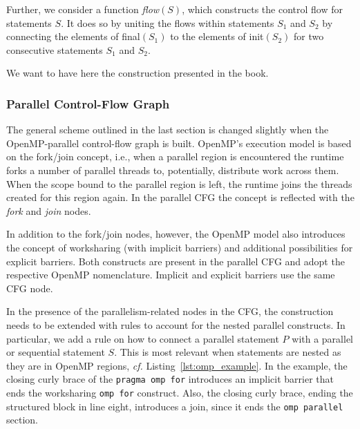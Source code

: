 \documentclass[natbib]{article}
\begin{document}
Further, we consider a function \emph{flow}$(S)$, which constructs the control flow for statements $S$.
It does so by uniting the flows within statements $S_1$ and $S_2$ by connecting the elements of final$(S_1)$ to the elements of init$(S_2)$ for two consecutive statements $S_1$ and $S_2$.

We want to have here the construction presented in the book.

\subsubsection{Parallel Control-Flow Graph}
The general scheme outlined in the last section is changed slightly when the OpenMP-parallel control-flow graph is built.
OpenMP's execution model is based on the fork/join concept, i.e., when a parallel region is encountered the runtime forks a number of parallel threads to, potentially, distribute work across them.
When the scope bound to the parallel region is left, the runtime joins the threads created for this region again.
In the parallel CFG the concept is reflected with the \emph{fork} and \emph{join} nodes.

In addition to the fork/join nodes, however, the OpenMP model also introduces the concept of worksharing (with implicit barriers) and additional possibilities for explicit barriers.
Both constructs are present in the parallel CFG and adopt the respective OpenMP nomenclature.
Implicit and explicit barriers use the same CFG node.

In the presence of the parallelism-related nodes in the CFG, the construction needs to be extended with rules to account for the nested parallel constructs.
In particular, we add a rule on how to connect a parallel statement $P$ with a parallel or sequential statement $S$.
This is most relevant when statements are nested as they are in OpenMP regions, \emph{cf.} Listing~\ref{lst:omp_example}.
In the example, the closing curly brace of the \texttt{pragma omp for} introduces an implicit barrier that ends the worksharing \texttt{omp for} construct.
Also, the closing curly brace, ending the structured block in line eight, introduces a join, since it ends the \texttt{omp parallel} section.
\end{document}
